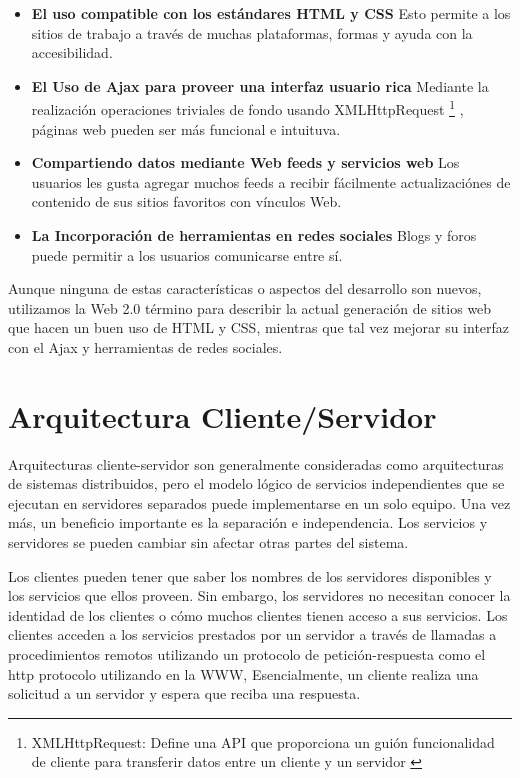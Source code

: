 \begin{itemize}

\item \textbf{El uso compatible con los est\'{a}ndares HTML y CSS} Esto permite a
 los sitios de trabajo a trav\'{e}s de muchas plataformas, formas y ayuda con la
 accesibilidad.
\item \textbf{El Uso de Ajax para proveer una interfaz usuario rica} Mediante la
realizaci\'{o}n operaciones triviales de fondo usando XMLHttpRequest 
\footnote{XMLHttpRequest: Define una API que proporciona un gui\'{o}n 
funcionalidad de cliente para transferir datos entre un cliente y un servidor 
\cite{xmlHttpRequest}} , p\'{a}ginas web pueden ser m\'{a}s funcional e 
intuituva.
\item \textbf{Compartiendo datos mediante Web feeds y servicios web} Los
usuarios les gusta agregar muchos feeds a recibir f\'{a}cilmente actualizaci\'{o}nes
de contenido de sus sitios favoritos con v\'{i}nculos Web.
\item \textbf{La Incorporaci\'{o}n de herramientas en redes sociales} Blogs y foros 
puede permitir a los usuarios comunicarse entre s\'{i}.
	
\end{itemize}

Aunque ninguna de estas caracter\'{i}sticas o aspectos del desarrollo son nuevos,
utilizamos la Web 2.0 t\'{e}rmino para describir la actual generaci\'{o}n de sitios
web que hacen un buen uso de HTML y CSS, mientras que tal vez mejorar su interfaz
con el Ajax y herramientas de redes sociales.\cite{zervaas2007practical}

\section{Arquitectura Cliente/Servidor}

Arquitecturas cliente-servidor son generalmente consideradas como arquitecturas
de sistemas distribuidos, pero el modelo l\'{o}gico de servicios independientes
que se ejecutan en servidores separados puede implementarse en un solo equipo.
Una vez m\'{a}s, un beneficio importante es la separaci\'{o}n e independencia.
Los servicios y servidores se pueden cambiar sin afectar otras partes del sistema.

Los clientes pueden tener que saber los nombres de los servidores disponibles y
los servicios que ellos proveen. Sin embargo, los servidores no necesitan conocer
la identidad de los clientes o c\'{o}mo muchos clientes tienen acceso a sus
servicios. Los clientes acceden a los servicios prestados por un servidor a 
trav\'{e}s de llamadas a procedimientos remotos utilizando un protocolo de 
petici\'{o}n-respuesta como el http protocolo utilizando en la WWW, Esencialmente,
un cliente realiza una solicitud a un servidor y espera que reciba una respuesta.

